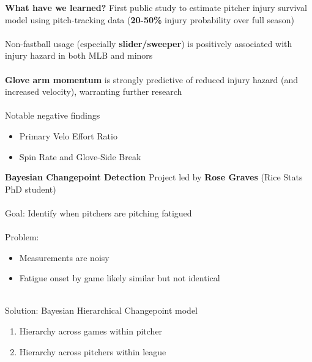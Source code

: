 \documentclass{beamer}
\begin{document}
  \begin{frame}{\bf What have we learned?}
    First public study to estimate pitcher injury survival model using pitch-tracking data (\alert{\bf 20-50\%} injury probability over full season)\\
    ~\\
    Non-fastball usage (especially \alert{\bf slider/sweeper}) is positively associated with injury hazard in both MLB and minors\\
    ~\\
    \alert{\bf Glove arm momentum} is strongly predictive of reduced injury hazard (and increased velocity), warranting further research\\
    ~\\
    Notable negative findings
    \begin{itemize}
      \item Primary Velo Effort Ratio
      \item Spin Rate and Glove-Side Break
    \end{itemize}
  \end{frame}

  \begin{frame}{\bf Bayesian Changepoint Detection}
    Project led by \alert{\bf Rose Graves} (Rice Stats PhD student)\\
    ~\\
    Goal: Identify when pitchers are pitching fatigued\\
    ~\\
    Problem:
    \begin{itemize}
      \item Measurements are noisy
      \item Fatigue onset by game likely similar but not identical
    \end{itemize}
    ~\\
    Solution: Bayesian Hierarchical Changepoint model
    \begin{enumerate}
      \item Hierarchy across games within pitcher
      \item Hierarchy across pitchers within league
    \end{enumerate}
  \end{frame}
\end{document}
